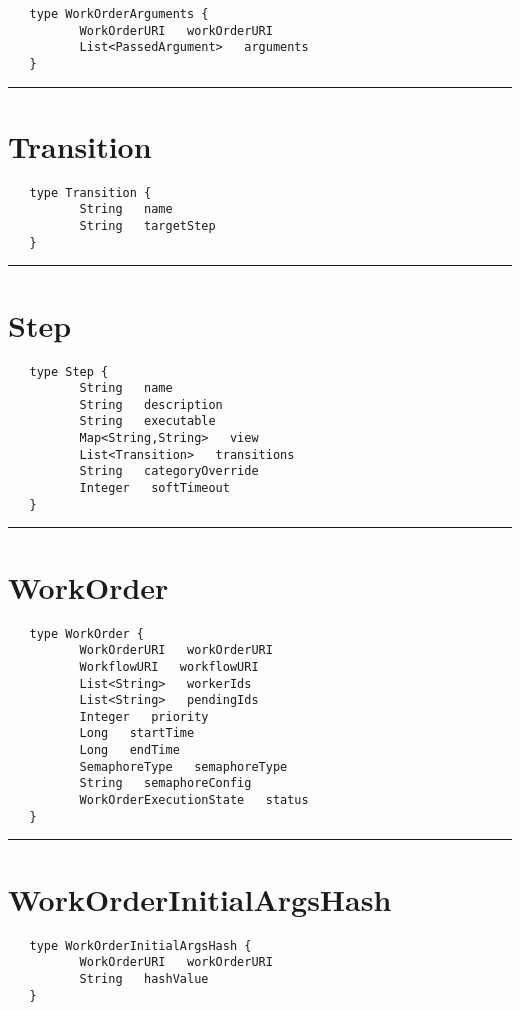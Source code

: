 \begin{verbatim}
   type WorkOrderArguments {
          WorkOrderURI   workOrderURI
          List<PassedArgument>   arguments
   }
\end{verbatim}

\rule{15cm}{2pt}
\section{Transition}
\label{type:Transition}

\begin{verbatim}
   type Transition {
          String   name
          String   targetStep
   }
\end{verbatim}

\rule{15cm}{2pt}
\section{Step}
\label{type:Step}

\begin{verbatim}
   type Step {
          String   name
          String   description
          String   executable
          Map<String,String>   view
          List<Transition>   transitions
          String   categoryOverride
          Integer   softTimeout
   }
\end{verbatim}

\rule{15cm}{2pt}
\section{WorkOrder}
\label{type:WorkOrder}

\begin{verbatim}
   type WorkOrder {
          WorkOrderURI   workOrderURI
          WorkflowURI   workflowURI
          List<String>   workerIds
          List<String>   pendingIds
          Integer   priority
          Long   startTime
          Long   endTime
          SemaphoreType   semaphoreType
          String   semaphoreConfig
          WorkOrderExecutionState   status
   }
\end{verbatim}

\rule{15cm}{2pt}
\section{WorkOrderInitialArgsHash}
\label{type:WorkOrderInitialArgsHash}

\begin{verbatim}
   type WorkOrderInitialArgsHash {
          WorkOrderURI   workOrderURI
          String   hashValue
   }
\end{verbatim}

